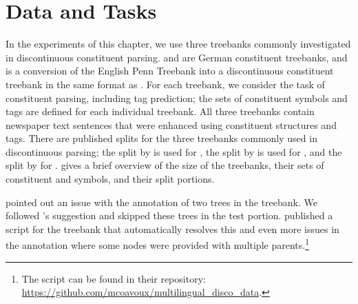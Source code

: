 \documentclass[../../document.tex]{subfiles}
\begin{document}
    \section{Data and Tasks}\label{sec:treebanks}
    In the experiments of this chapter, we use three treebanks commonly investigated in discontinuous constituent parsing.
     \citep{Skut98} and \tiger{} \citep{Brants04} are German constituent treebanks, and \dptb{} \citep{EvaKal11} is a conversion of the English Penn Treebank \citep{Marcus94} into a discontinuous constituent treebank in the same format as \negra{}.
    For each treebank, we consider the task of constituent parsing, including  tag prediction; the sets of constituent symbols and  tags are defined for each individual treebank.
    All three treebanks contain newspaper text sentences that were enhanced using constituent structures and  tags.
    There are published splits for the three treebanks commonly used in discontinuous parsing; the split by \citet{DubKel03} is used for \negra{}, the split by \citet{Sed13} is used for \tiger{}, and the split by \citet{collins-1996-new} for \dptb{}.
     gives a brief overview of the size of the treebanks, their sets of constituent and  symbols, and their split portions.

     pointed out an issue with the annotation of two trees in the \tiger{} treebank.
    We followed \citeauthor{Maier15}'s suggestion and skipped these trees in the test portion.
     published a script for the \tiger{} treebank that automatically resolves this and even more issues in the annotation where some nodes were provided with multiple parents.\footnote{The script can be found in their repository: \url{https://github.com/mcoavoux/multilingual_disco_data}.}
\end{document}
